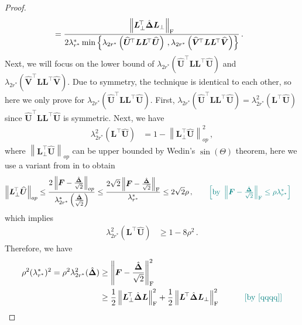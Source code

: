 \begin{proof}
\begin{align*}
    & = \frac{\left\|\bm L_\perp^{\!\top}\hat{\bm \Delta}\bm L_\perp\right\|_{\rm F}}{2\lambda^*_{r^*} \min\left\{\lambda_{2r^*}\left(\widehat{\bm U}^{\!\top}\bm L \bm L^{\!\top} \widehat{\bm U}\right)\,,\lambda_{2r^*}\left(\widehat{\bm V}^{\!\top}\bm L \bm L^{\!\top} \widehat{\bm V}\right)\right\}}\,.
\end{align*}
Next, we will focus on the lower bound of $\lambda_{2r^*}\left(\widehat{\bm U}^{\!\top}\bm L \bm L^{\!\top} \widehat{\bm U}\right)$ and $\lambda_{2r^*}\left(\widehat{\bm V}^{\!\top}\bm L \bm L^{\!\top} \widehat{\bm V}\right)$. Due to symmetry, the technique is identical to each other, so here we only prove for $\lambda_{2r^*}\left(\widehat{\bm U}^{\!\top}\bm L \bm L^{\!\top} \widehat{\bm U}\right)$. First, $\lambda_{2r^*}\left(\widehat{\bm U}^{\!\top}\bm L \bm L^{\!\top} \widehat{\bm U}\right)=\lambda^2_{2r^*}\left(\bm L^{\!\top} \widehat{\bm U}\right)$ since $\widehat{\bm U}^{\!\top}\bm L \bm L^{\!\top} \widehat{\bm U}$ is symmetric. Next, we have
\begin{align*}
    \lambda^2_{2r^*}\left(\bm L^{\!\top} \widehat{\bm U}\right) & = 1 - \left\|\bm L_\perp^{\!\top} \widehat{\bm U}\right\|^2_{op}\,,
\end{align*}
where $\left\|\bm L_\perp^{\!\top} \widehat{\bm U}\right\|_{op}$ can be upper bounded by Wedin’s $\sin(\Theta)$ theorem, here we use a variant from in \citet[Theorem 2.9]{chen2021spectral} to obtain
\begin{align*}
    \left\|\bm L_\perp^{\!\top} \widehat{\bm U}\right\|_{op} & \leq \frac{2\left\|\bm F-\frac{\hat{\bm \Delta}}{\sqrt{2}}\right\|_{op}}{\lambda^*_{2r^*}\left(\frac{\hat{\bm \Delta}}{\sqrt{2}}\right)} \leq \frac{2\sqrt{2}\left\|\bm F-\frac{\hat{\bm \Delta}}{\sqrt{2}}\right\|_{\rm F}}{\lambda^*_{r^*}} \leq 2\sqrt{2} \rho \,,\tag*{\color{teal}$\left[\text{by }\left\|\bm F-\frac{\hat{\bm \Delta}}{\sqrt{2}}\right\|_{\rm F}\leq \rho \lambda^*_{r^*}\right]$}
\end{align*}
which implies
\begin{align}
    \lambda^2_{2r^*}\left(\bm L^{\!\top} \widehat{\bm U}\right) & \geq 1 - 8\rho^2\,.\label{sin-theta-min-lower}
\end{align}
Therefore, we have
\begin{align*}
    \rho^2 (\lambda^*_{r^*})^2 = \rho^2 \lambda^2_{2r^*}(\hat{\bm \Delta}) & \geq \left\|\bm F-\frac{\hat{\bm \Delta}}{\sqrt{2}}\right\|^2_{\rm F}\\
    & \geq \frac{1}{2}\left\|\bm L_\perp^{\!\top}\hat{\bm \Delta}\bm L\right\|^2_{\rm F} + \frac{1}{2}\left\|\bm L^{\!\top}\hat{\bm \Delta}\bm L_\perp\right\|^2_{\rm F} \quad \tag*{\color{teal}[by \cref{qqqq}]}\\

\end{align*}
\end{proof}
